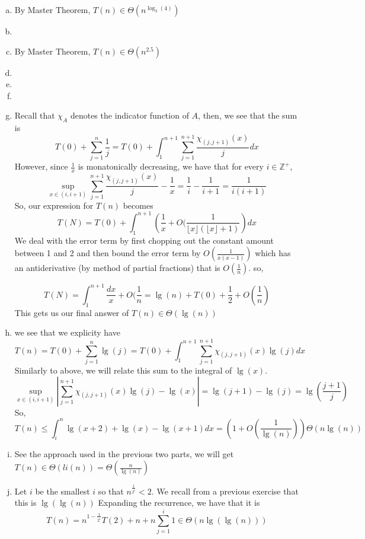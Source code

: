 \documentclass{article}
\begin{document}
\begin{enumerate}[a)]
\item
By Master Theorem, $T(n) \in \Theta(n^{\log_3(4)})$

\item

\item
By Master Theorem, $T(n) \in \Theta(n^{2.5})$


\item

\item

\item

\item
Recall that $\chi_A$ denotes the indicator function of $A$, then, we see that the sum is
\[
T(0) + \sum_{j=1}^{n} \frac{1}{j} = T(0) + \int_{1}^{n+1} \sum_{j=1}^{n+1} \frac{\chi_{(j,j+1)}(x)}{j} dx 
\]
However, since $\frac{1}{x}$ is monatonically decreasing, we have that for every $i\in \mathbb{Z}^+$,
\[
\sup_{x\in (i,i+1)}  \sum_{j=1}^{n+1} \frac{\chi_{(j,j+1)}(x)}{j}  - \frac{1}{x} = \frac{1}{i}  - \frac{1}{i+1} = \frac{1}{i(i+1)}
\]
So, our expression for $T(n)$ becomes
\[
T(N) = T(0)+ \int_1^{n+1} \left(\frac{1}{x} + O(\frac{1}{\lfloor x\rfloor(\lfloor x\rfloor+1)}\right)dx
\]
We deal with the error term by first chopping out the constant amount between 1 and 2 and then bound the error term by $O(\frac{1}{x(x-1)})$ which has an antiderivative (by method of partial fractions) that is $O(\frac{1}{n})$. so,

\[
T(N) = \int_1^{n+1} \frac{dx}{x} + O(\frac{1}{n} = \lg(n) + T(0) + \frac{1}{2} + O(\frac{1}{n})
\]
This gets us our final answer of $T(n) \in \Theta(\lg(n))$
\item
we see that we explicity have
\[
T(n) = T(0) +\sum_{j=1}^n \lg(j) = T(0) + \int_1^{n+1} \sum_{j=1}^{n+1} \chi_{(j,j+1)}(x)\lg(j) dx 
\]
Similarly to above, we will relate this sum to the integral of $\lg(x)$. 
\[
\sup_{x\in (i,i+1)}  \left|\sum_{j=1}^{n+1} \chi_{(j,j+1)}(x)\lg(j)  - \lg(x)\right| = \lg(j+1) - \lg(j) = \lg\left(\frac{j+1}{j}\right)
\]
So, 
\[
T(n) \le \int_{i}^n \lg(x+2) + \lg(x) - \lg(x+1) dx  = (1  + O(\frac{1}{\lg(n)}))\Theta(n\lg(n))
\]
\item
See the approach used in the previous two parts, we will get $T(n) \in \Theta(li(n))= \Theta( \frac{n}{\lg(n)})$
\item
Let $i$ be the smallest $i$ so that $n^{\frac{1}{2^i}}<2$. We recall from a previous exercise that this is $\lg(\lg(n))$ Expanding the recurrence, we have that it is 
\[
T(n) = n^{1 - \frac{1}{2^i}} T(2) + n + n \sum_{j=1}^i 1 \in \Theta(n\lg(\lg(n)))
\]



\end{enumerate}
\end{document}
